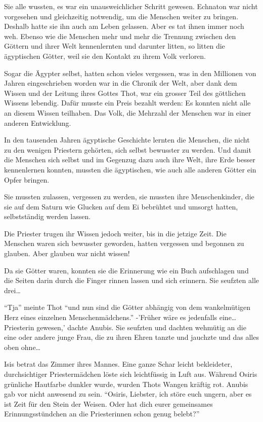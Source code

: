 \documentclass[11pt,titlepage,a5paper]{book}
\begin{document}
Sie alle wussten, es war ein unausweichlicher Schritt gewesen. Echnaton war nicht vorgesehen und gleichzeitig notwendig, um die Menschen weiter zu bringen. Deshalb hatte sie ihn auch am Leben gelassen. Aber es tat ihnen immer noch weh. Ebenso wie die Menschen mehr und mehr die Trennung zwischen den Göttern und ihrer Welt kennenlernten und darunter litten, so litten die ägyptischen Götter, weil sie den Kontakt zu ihrem Volk verloren.

Sogar die Ägypter selbst, hatten schon vieles vergessen, was in den Millionen von Jahren eingeschrieben worden war in die Chronik der Welt, aber dank dem Wissen und der Leitung ihres Gottes Thot, war ein grosser Teil des göttlichen Wissens lebendig. Dafür musste ein Preis bezahlt werden: Es konnten nicht alle an diesem Wissen teilhaben. Das Volk, die Mehrzahl der Menschen war in einer anderen Entwicklung.

In den tausenden Jahren ägyptische Geschichte lernten die Menschen, die nicht zu den wenigen Priestern gehörten, sich selbst bewusster zu werden. Und damit die Menschen sich selbst und im Gegenzug dazu auch ihre Welt, ihre Erde besser kennenlernen konnten, mussten die ägyptischen, wie auch alle anderen Götter ein Opfer bringen.

Sie mussten zulassen, vergessen zu werden, sie mussten ihre Menschenkinder, die sie auf dem Saturn wie Glucken auf dem Ei bebrühtet und umsorgt hatten, selbstständig werden lassen.

Die Priester trugen ihr Wissen jedoch weiter, bis in die jetzige Zeit. Die Menschen waren sich bewusster geworden, hatten vergessen und begonnen zu glauben. Aber glauben war nicht wissen!

Da sie Götter waren, konnten sie die Erinnerung wie ein Buch aufschlagen und die Seiten darin durch die Finger rinnen lassen und sich erinnern. Sie seufzten alle drei\dots 

"`Tja"' meinte Thot "`und nun sind die Götter abhängig von dem wankelmütigen Herz eines einzelnen Menschenmädchens."' -'Früher wäre es jedenfalls eine\dots Priesterin gewesen,' dachte Anubis. Sie seufzten und dachten wehmütig an die eine oder andere junge Frau, die zu ihren Ehren tanzte und jauchzte und das alles oben ohne\dots

Isis betrat das Zimmer ihres Mannes. Eine ganze Schar leicht bekleideter, durchsichtiger Priestermädchen löste sich leichtfüssig in Luft aus. Während Osiris grünliche Hautfarbe dunkler wurde, wurden Thots Wangen kräftig rot. Anubis gab vor nicht anwesend zu sein. "`Osiris, Liebster, ich störe euch ungern, aber es ist Zeit für den Stein der Weisen. Oder hat dich eurer gemeinsames Erinnungsstündchen an die Priesterinnen schon genug belebt?"' 
\end{document}
